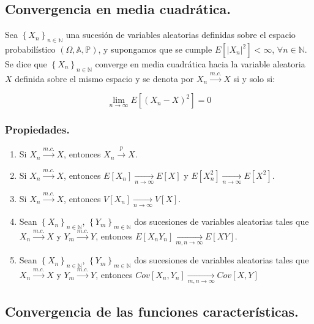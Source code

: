 \subsection{Convergencia en media cuadr\'atica.}
\begin{definicion}
Sea $ \left\{X_n\right\}_{n\in\mathbb{N}}$ una sucesi\'on de variables aleatorias definidas sobre el espacio probabil\'istico $\left(\Omega,\mathbb{A}, \mathbb{P}\right) $, y supongamos que se cumple $E[|X_n|^2]<\infty$, $\forall n\in\mathbb{N}$. Se dice que $ \left\{X_n\right\}_{n\in\mathbb{N}}$ converge en media cuadr\'atica hacia la variable aleatoria $X$ definida sobre el mismo espacio y se denota por $X_{n} \overset{m.c.}{\to} X $ si y solo si:

\begin{equation}
\lim_{n\to\infty}E[(X_n-X)^2]=0
\end{equation}

\end{definicion}

\subsubsection{Propiedades.}
\begin{enumerate}
\item Si $X_{n} \overset{m.c.}{\to} X $, entonces $X_{n} \overset{p}{\to} X $.
\item Si $X_{n} \overset{m.c.}{\to} X $, entonces $E[X_n]\underset{n\to\infty}{\to}E[X]$ y $E[X_n^2]\underset{n\to\infty}{\to}E[X^2]$.
\item Si $X_{n} \overset{m.c.}{\to} X $, entonces $V[X_n]\underset{n\to\infty}{\to}V[X]$.
\item Sean $ \left\{X_n\right\}_{n\in\mathbb{N}}$, $ \left\{Y_m\right\}_{m\in\mathbb{N}}$ dos sucesiones de variables aleatorias tales que $X_{n} \overset{m.c.}{\to} X $ y $Y_{m} \overset{m.c.}{\to} Y $, entonces $E[X_nY_n]\underset{m,n\to\infty}{\to}E[XY]$.
\item Sean $ \left\{X_n\right\}_{n\in\mathbb{N}}$, $ \left\{Y_m\right\}_{m\in\mathbb{N}}$ dos sucesiones de variables aleatorias tales que $X_{n} \overset{m.c.}{\to} X $ y $Y_{m} \overset{m.c.}{\to} Y $, entonces $Cov[X_n,Y_n]\underset{m,n\to\infty}{\to}Cov[X,Y]$

\end{enumerate}
\subsection{Convergencia de las funciones caracter\'isticas.}

